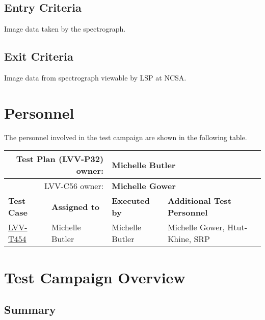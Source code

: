 \documentclass[DM,lsstdraft,STR,toc]{lsstdoc}
\begin{document}
  \subsection{Entry Criteria}
  Image data taken by the spectrograph. ~


  \subsection{Exit Criteria}
  Image data from spectrograph viewable by LSP at NCSA.~



\newpage
\section{Personnel}
\label{sect:personnel}

The personnel involved in the test campaign are shown in the following table.

\begin{longtable}{p{3cm}p{3cm}p{3cm}p{6cm}}
\hline
\multicolumn{2}{r}{Test Plan (LVV-P32) owner:} &
\multicolumn{2}{l}{\textbf{ Michelle Butler } }\\\hline
\multicolumn{2}{r}{ LVV-C56 owner:} &
\multicolumn{2}{l}{\textbf{
    Michelle Gower
}
} \\\hline
\textbf{Test Case} & \textbf{Assigned to} & \textbf{Executed by} & \textbf{Additional Test Personnel} \\ \hline
\href{https://jira.lsstcorp.org/secure/Tests.jspa#/testCase/LVV-T454}{LVV-T454}
& {\small Michelle Butler } & {\small Michelle Butler } &
\begin{minipage}[]{6cm}
\smallskip
{\small Michelle Gower, Htut-Khine, SRP
 }
\medskip
\end{minipage}
\\ \hline
\end{longtable}

\newpage

\section{Test Campaign Overview}
\label{sect:overview}

\subsection{Summary}
\label{sect:summarytable}
\end{document}
